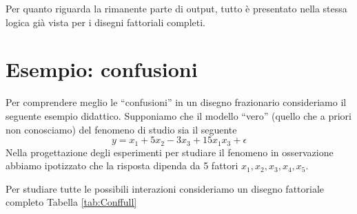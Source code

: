 \documentclass[
  11pt,
]{book}
\begin{document}
Per quanto riguarda la rimanente parte di output, tutto è presentato nella stessa logica già vista per i disegni fattoriali completi.

\hypertarget{esempio-confusioni}{%
\section{Esempio: confusioni}\label{esempio-confusioni}}

Per comprendere meglio le ``confusioni'' in un disegno frazionario consideriamo il seguente esempio didattico. Supponiamo che il modello ``vero'' (quello che a priori non conosciamo) del fenomeno di studio sia il seguente
\[
y=x_1+5x_2-3x_3+15x_1x_3+\epsilon
\]
Nella progettazione degli esperimenti per studiare il fenomeno in osservazione abbiamo ipotizzato che la risposta dipenda da 5 fattori \(x_1,x_2,x_3,x_4,x_5\).

Per studiare tutte le possibili interazioni consideriamo un disegno fattoriale completo Tabella \ref{tab:Conffull}
\end{document}
